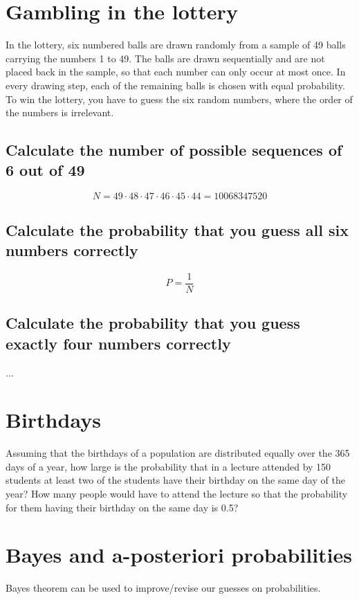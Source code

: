 \documentclass[11 pt]{article}
\begin{document}
    \section{Gambling in the lottery}
        In the lottery, six numbered balls are drawn randomly from a sample of 
        49 balls carrying the numbers 1 to 49. The balls are drawn 
        sequentially and are not placed back in the sample, so that each number
        can only occur at most once. In every drawing step, each of the 
        remaining balls is chosen with equal probability. To win the lottery,
        you have to guess the six random numbers, where the order of the 
        numbers is irrelevant.

        \subsection{Calculate the number of possible sequences of 6 out of 49}

            \begin{equation}
                N
                =49\cdot48\cdot47\cdot46\cdot45\cdot44
                =10068347520
            \end{equation}

        \subsection{Calculate the probability that you guess all six numbers correctly}

            \begin{equation}
                P
                =\frac{1}{N}
            \end{equation}

        \subsection{Calculate the probability that you guess exactly four numbers correctly}

            ...

    \section{Birthdays}
        Assuming that the birthdays of a population are distributed equally 
        over the 365 days of a year, how large is the probability that in a 
        lecture attended by 150 students at least two of the students have 
        their birthday on the same day of the year? How many people would have
        to attend the lecture so that the probability for them having their 
        birthday on the same day is 0.5?

    \section{Bayes and a-posteriori probabilities}
        Bayes theorem can be used to improve/revise our guesses on 
        probabilities.
\end{document}

